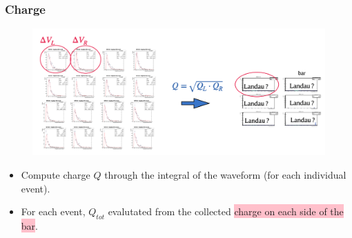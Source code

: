 \begin{frame} [fragile]
    \small
        \frametitle{Charge}
                \begin{figure}
                 \centering
                    \includegraphics[scale=0.28]{figures/charge1.png}
                \end{figure}
                \begin{block}{}
                    \begin{itemize}
                        \item Compute charge $Q$ through the integral of the waveform (for each individual event).
                        \item For each event, $Q_{tot}$ evalutated from the collected \colorbox{pink}{charge on each side of the bar}.
                    \end{itemize}
                \end{block}
    \end{frame}

